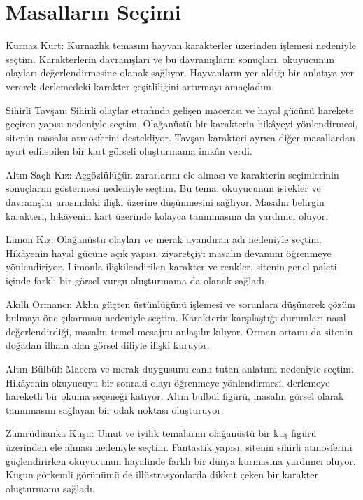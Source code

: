 \documentclass[12pt,a4paper]{article}
\begin{document}
\section{Masalların Seçimi}
Kurnaz Kurt: Kurnazlık temasını hayvan karakterler üzerinden işlemesi nedeniyle seçtim. Karakterlerin davranışları ve bu davranışların sonuçları, okuyucunun olayları değerlendirmesine olanak sağlıyor. Hayvanların yer aldığı bir anlatıya yer vererek derlemedeki karakter çeşitliliğini artırmayı amaçladım.

Sihirli Tavşan: Sihirli olaylar etrafında gelişen macerası ve hayal gücünü harekete geçiren yapısı nedeniyle seçtim. Olağanüstü bir karakterin hikâyeyi yönlendirmesi, sitenin masalsı atmosferini destekliyor. Tavşan karakteri ayrıca diğer masallardan ayırt edilebilen bir kart görseli oluşturmama imkân verdi.

Altın Saçlı Kız: Açgözlülüğün zararlarını ele alması ve karakterin seçimlerinin sonuçlarını göstermesi nedeniyle seçtim. Bu tema, okuyucunun istekler ve davranışlar arasındaki ilişki üzerine düşünmesini sağlıyor. Masalın belirgin karakteri, hikâyenin kart üzerinde kolayca tanınmasına da yardımcı oluyor.

Limon Kız: Olağanüstü olayları ve merak uyandıran adı nedeniyle seçtim. Hikâyenin hayal gücüne açık yapısı, ziyaretçiyi masalın devamını öğrenmeye yönlendiriyor. Limonla ilişkilendirilen karakter ve renkler, sitenin genel paleti içinde farklı bir görsel vurgu oluşturmama da olanak sağladı.

Akıllı Ormancı: Aklın güçten üstünlüğünü işlemesi ve sorunlara düşünerek çözüm bulmayı öne çıkarması nedeniyle seçtim. Karakterin karşılaştığı durumları nasıl değerlendirdiği, masalın temel mesajını anlaşılır kılıyor. Orman ortamı da sitenin doğadan ilham alan görsel diliyle ilişki kuruyor.

Altın Bülbül: Macera ve merak duygusunu canlı tutan anlatımı nedeniyle seçtim. Hikâyenin okuyucuyu bir sonraki olayı öğrenmeye yönlendirmesi, derlemeye hareketli bir okuma seçeneği katıyor. Altın bülbül figürü, masalın görsel olarak tanınmasını sağlayan bir odak noktası oluşturuyor.

Zümrüdüanka Kuşu: Umut ve iyilik temalarını olağanüstü bir kuş figürü üzerinden ele alması nedeniyle seçtim. Fantastik yapısı, sitenin sihirli atmosferini güçlendirirken okuyucunun hayalinde farklı bir dünya kurmasına yardımcı oluyor. Kuşun görkemli görünümü de illüstrasyonlarda dikkat çeken bir karakter oluşturmamı sağladı.
\end{document}
